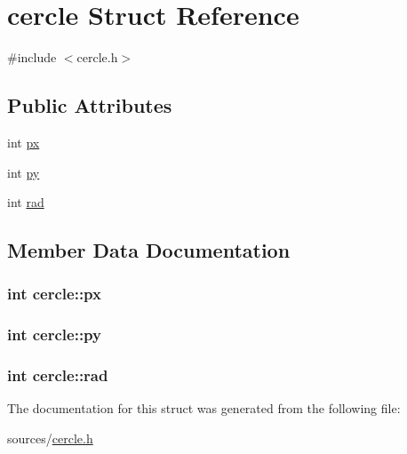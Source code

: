 \hypertarget{structcercle}{\section{cercle Struct Reference}
\label{structcercle}
}


{\ttfamily \#include $<$cercle.\-h$>$}

\subsection*{Public Attributes}
\begin{DoxyCompactItemize}
\item 
int \hyperlink{structcercle_a5562a54989b68677c21ba99ca69f0225}{px}
\item 
int \hyperlink{structcercle_a8451b9fa605ec46f27db15534e754196}{py}
\item 
int \hyperlink{structcercle_a9197d8e6ea6c2a49380667d7af3aae63}{rad}
\end{DoxyCompactItemize}


\subsection{Member Data Documentation}
\hypertarget{structcercle_a5562a54989b68677c21ba99ca69f0225}{
\subsubsection[{px}]{\setlength{\rightskip}{0pt plus 5cm}int cercle\-::px}}\label{structcercle_a5562a54989b68677c21ba99ca69f0225}
\hypertarget{structcercle_a8451b9fa605ec46f27db15534e754196}{
\subsubsection[{py}]{\setlength{\rightskip}{0pt plus 5cm}int cercle\-::py}}\label{structcercle_a8451b9fa605ec46f27db15534e754196}
\hypertarget{structcercle_a9197d8e6ea6c2a49380667d7af3aae63}{
\subsubsection[{rad}]{\setlength{\rightskip}{0pt plus 5cm}int cercle\-::rad}}\label{structcercle_a9197d8e6ea6c2a49380667d7af3aae63}


The documentation for this struct was generated from the following file\-:\begin{DoxyCompactItemize}
\item 
sources/\hyperlink{cercle_8h}{cercle.\-h}\end{DoxyCompactItemize}
